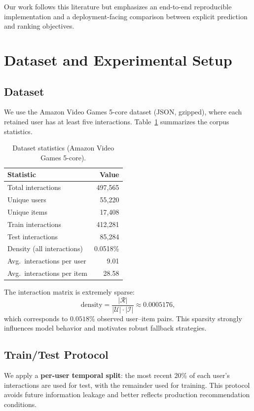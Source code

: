 \documentclass[sigconf,nonacm]{acmart}
\begin{document}
Our work follows this literature but emphasizes an end-to-end reproducible implementation and a deployment-facing comparison between explicit prediction and ranking objectives.

\section{Dataset and Experimental Setup}

\subsection{Dataset}
We use the Amazon Video Games 5-core dataset (JSON, gzipped), where each retained user has at least five interactions. Table~\ref{tab:data-stats} summarizes the corpus statistics.

\begin{table}[t]
  \caption{Dataset statistics (Amazon Video Games 5-core).}
  \label{tab:data-stats}
  \centering
  \begin{tabular}{lr}
    \toprule
    Statistic & Value \\
    \midrule
    Total interactions & 497,565 \\
    Unique users & 55,220 \\
    Unique items & 17,408 \\
    Train interactions & 412,281 \\
    Test interactions & 85,284 \\
    Density (all interactions) & 0.0518\% \\
    Avg.\ interactions per user & 9.01 \\
    Avg.\ interactions per item & 28.58 \\
    \bottomrule
  \end{tabular}
\end{table}

The interaction matrix is extremely sparse:
\begin{equation}
\text{density} = \frac{|\mathcal{R}|}{|\mathcal{U}| \cdot |\mathcal{I}|} \approx 0.0005176,
\end{equation}
which corresponds to $0.0518\%$ observed user--item pairs. This sparsity strongly influences model behavior and motivates robust fallback strategies.

\subsection{Train/Test Protocol}
We apply a \textbf{per-user temporal split}: the most recent 20\% of each user's interactions are used for test, with the remainder used for training. This protocol avoids future information leakage and better reflects production recommendation conditions.
\end{document}
